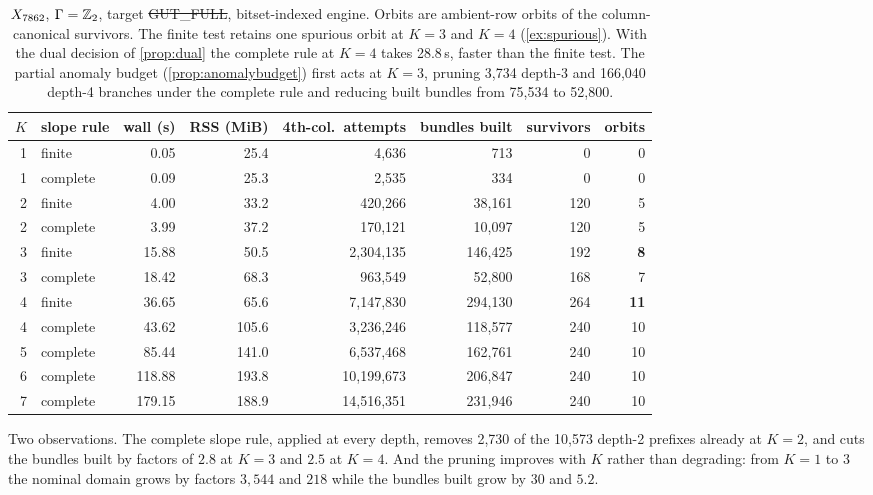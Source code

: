 \begin{table}[t]
\centering\small
\begin{tabular}{@{}rlrrrrrr@{}}
\toprule
$K$ & slope rule & wall (s) & RSS (MiB) & 4th-col.\ attempts & bundles built & survivors & orbits \\
\midrule
1 & finite & 0.05 & 25.4 & 4,636 & 713 & 0 & 0 \\
1 & complete & 0.09 & 25.3 & 2,535 & 334 & 0 & 0 \\
2 & finite & 4.00 & 33.2 & 420,266 & 38,161 & 120 & 5 \\
2 & complete & 3.99 & 37.2 & 170,121 & 10,097 & 120 & 5 \\
3 & finite & 15.88 & 50.5 & 2,304,135 & 146,425 & 192 & \textbf{8} \\
3 & complete & 18.42 & 68.3 & 963,549 & 52,800 & 168 & 7 \\
4 & finite & 36.65 & 65.6 & 7,147,830 & 294,130 & 264 & \textbf{11} \\
4 & complete & 43.62 & 105.6 & 3,236,246 & 118,577 & 240 & 10 \\
5 & complete & 85.44 & 141.0 & 6,537,468 & 162,761 & 240 & 10 \\
6 & complete & 118.88 & 193.8 & 10,199,673 & 206,847 & 240 & 10 \\
7 & complete & 179.15 & 188.9 & 14,516,351 & 231,946 & 240 & 10 \\
\bottomrule
\end{tabular}
\caption{$X_{7862}$, $\Gamma=\mathbb{Z}_2$, target \st{GUT\_FULL}, bitset-indexed engine.
Orbits are ambient-row orbits of the column-canonical survivors. The finite test
retains one spurious orbit at $K=3$ and $K=4$ (\cref{ex:spurious}). With the dual
decision of \cref{prop:dual} the complete rule at $K=4$ takes 28.8\,s, faster
than the finite test. The partial anomaly budget (\cref{prop:anomalybudget})
first acts at $K=3$, pruning 3,734 depth-3 and 166,040 depth-4 branches under the
complete rule and reducing built bundles from 75,534 to 52,800.}
\label{tab:ablation}
\end{table}

Two observations. The complete slope rule, applied at every depth, removes
2,730 of the 10,573 depth-2 prefixes already at $K=2$, and cuts the bundles
built by factors of $2.8$ at $K=3$ and $2.5$ at $K=4$. And the pruning improves
with $K$ rather than degrading: from $K=1$ to $3$ the nominal domain grows by
factors $3,544$ and $218$ while the bundles built grow by $30$ and $5.2$.
